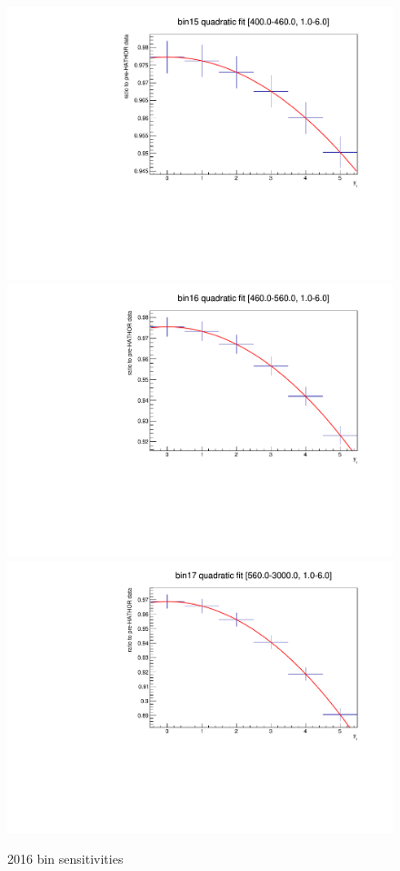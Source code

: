 \begin{figure}
\includegraphics[width=.32\linewidth]{quadplots/2016bin15.pdf}
\includegraphics[width=.32\linewidth]{quadplots/2016bin16.pdf}
\includegraphics[width=.32\linewidth]{quadplots/2016bin17.pdf}
\caption{2016 bin sensitivities}
\label{fig:2016bins}
\end{figure}


